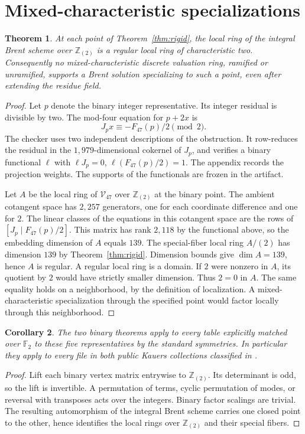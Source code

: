 \documentclass[11pt,reqno]{amsart}
\newcommand{\F}{\mathbb F}
\newcommand{\Z}{\mathbb Z}
\newcommand{\Brent}{\mathcal V}
\newtheorem{theorem}{Theorem}[section]
\newtheorem{corollary}[theorem]{Corollary}
\begin{document}
\section{Mixed-characteristic specializations}
\begin{theorem}\label{thm:ramified}
At each point of Theorem~\ref{thm:rigid}, the local ring of the integral Brent scheme over \(\Z_{(2)}\) is a regular local ring of characteristic two. Consequently no mixed-characteristic discrete valuation ring, ramified or unramified, supports a Brent solution specializing to such a point, even after extending the residue field.
\end{theorem}
\begin{proof}
Let \(p\) denote the binary integer representative. Its integer residual is divisible by two. The mod-four equation for \(p+2x\) is
\[
 J_p x\equiv -F_{47}(p)/2\pmod{2}.
\]
The checker uses two independent descriptions of the obstruction. It row-reduces the residual in the \(1,979\)-dimensional cokernel of \(J_p\), and verifies a binary functional \(\ell\) with \(\ell J_p=0\), \(\ell(F_{47}(p)/2)=1\). The appendix records the projection weights. The supports of the functionals are frozen in the artifact.

Let \(A\) be the local ring of \(\Brent_{47}\) over \(\Z_{(2)}\) at the binary point. The ambient cotangent space has \(2,257\) generators, one for each coordinate difference and one for \(2\). The linear classes of the equations in this cotangent space are the rows of \([J_p\mid F_{47}(p)/2]\). This matrix has rank \(2,118\) by the functional above, so the embedding dimension of \(A\) equals \(139\). The special-fiber local ring \(A/(2)\) has dimension \(139\) by Theorem~\ref{thm:rigid}. Dimension bounds give \(\dim A=139\), hence \(A\) is regular. A regular local ring is a domain. If \(2\) were nonzero in \(A\), its quotient by \(2\) would have strictly smaller dimension. Thus \(2=0\) in \(A\). The same equality holds on a neighborhood, by the definition of localization. A mixed-characteristic specialization through the specified point would factor locally through this neighborhood.
\end{proof}

\begin{corollary}\label{cor:catalogue}
The two binary theorems apply to every table explicitly matched over \(\F_2\) to these five representatives by the standard symmetries. In particular they apply to every file in both public Kauers collections classified in \cite[Appendix B.1]{tomar}.
\end{corollary}
\begin{proof}
Lift each binary vertex matrix entrywise to \(\Z_{(2)}\). Its determinant is odd, so the lift is invertible. A permutation of terms, cyclic permutation of modes, or reversal with transposes acts over the integers. Binary factor scalings are trivial. The resulting automorphism of the integral Brent scheme carries one closed point to the other, hence identifies the local rings over \(\Z_{(2)}\) and their special fibers.
\end{proof}
\end{document}
